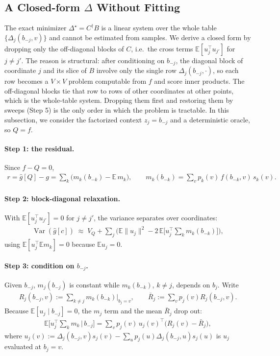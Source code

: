 \documentclass[10pt]{article}
\providecommand{\E}{\mathbb{E}}
\providecommand{\Var}{\operatorname{Var}}
\theoremstyle{plain}
\theoremstyle{definition}
\theoremstyle{remark}
\theoremstyle{definition}
\newcommand{\ctx}[1]{z_{#1}}                 %
\newcommand{\score}[1]{s_{#1}}               %
\newcommand{\ghat}[1]{\hat g[#1]}            %
\newcommand{\gtrue}{g}                       %
\newcommand{\Dstar}{\Delta^{\star}}
\newcommand{\VQ}{V_{Q}}
\newcommand{\pj}[1]{p_{#1}}                  %
\begin{document}
\subsection{A Closed-form $\Delta$ Without Fitting}\label{sec:local_delta}
The exact minimizer $\Dstar=C^\dagger B$ is a linear system over the whole table $\{\Delta_j(b_{-j},v)\}$ and cannot be estimated from samples. We derive a closed form by dropping only the off-diagonal blocks of $C$, i.e.\ the cross terms $\E[u_j^\top u_{j'}]$ for $j\neq j'$. The reason is structural: after conditioning on $b_{-j}$, the diagonal block of coordinate $j$ and its slice of $B$ involve only the single row $\Delta_j(b_{-j},\cdot)$, so each row becomes a $V\times V$ problem computable from $f$ and score inner products. The off-diagonal blocks tie that row to rows of other coordinates at other points, which is the whole-table system. Dropping them first and restoring them by sweeps (Step 5) is the only order in which the problem is tractable. In this subsection, we consider the factorized context $\ctx{j}=b_{-j}$ and a deterministic oracle, so $Q=f$.

\paragraph{Step 1: the residual.} Since $f-Q=0$,
\begin{align}
    r=\ghat{Q}-\gtrue=\sum_k\big(m_k(b_{-k})-\E\,m_k\big),\qquad m_k(b_{-k})=\sum_{v}\pj{k}(v)\,f(b_{-k},v)\,\score{k}(v).
\end{align}

\paragraph{Step 2: block-diagonal relaxation.} With $\E[u_j^\top u_{j'}]=0$ for $j\ne j'$, the variance separates over coordinates:
\begin{align}
    \Var(\ghat{c})\;\approx\;\VQ+\sum_j\Big(\E\|u_j\|^2-2\,\E\big[u_j^\top\textstyle\sum_k m_k(b_{-k})\big]\Big),
\end{align}
using $\E[u_j^\top\E m_k]=0$ because $\E u_j=0$.

\paragraph{Step 3: condition on $b_{-j}$.} Given $b_{-j}$, $m_j(b_{-j})$ is constant while $m_k(b_{-k})$, $k\neq j$, depends on $b_j$. Write
\begin{align}
    R_j(b_{-j},v):=\sum_{k\neq j} m_k(b_{-k})\Big|_{b_j=v},\qquad \bar R_j:=\sum_v \pj{j}(v)R_j(b_{-j},v).
\end{align}
Because $\E[u_j\mid b_{-j}]=0$, the $m_j$ term and the mean $\bar R_j$ drop out:
\begin{align}
    \E\big[u_j^\top\textstyle\sum_k m_k\,\big|\,b_{-j}\big]=\sum_v \pj{j}(v)\,u_j(v)^\top\big(R_j(v)-\bar R_j\big),
\end{align}
where $u_j(v):=\Delta_j(b_{-j},v)\score{j}(v)-\sum_u \pj{j}(u)\Delta_j(b_{-j},u)\score{j}(u)$ is $u_j$ evaluated at $b_j=v$.
\end{document}
